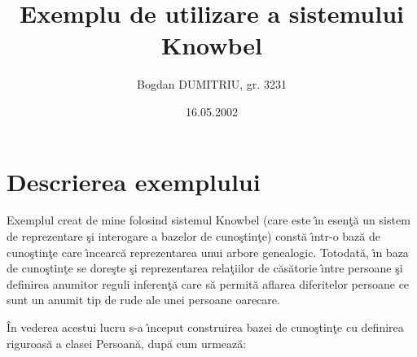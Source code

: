 \documentclass{article}
\title{Exemplu de utilizare a sistemului Knowbel}
\author{Bogdan DUMITRIU, gr. 3231}
\date{16.05.2002}
\begin{document}
\maketitle

\section{Descrierea exemplului}
Exemplul creat de mine folosind sistemul Knowbel (care este \^{\i}n esen\c{t}\u{a}
un sistem de reprezentare \c{s}i interogare a bazelor de cuno\c{s}tin\c{t}e)
const\u{a} \^{\i}ntr-o baz\u{a} de cuno\c{s}tin\c{t}e care \^{\i}ncearc\u{a}
reprezentarea unui arbore genealogic. Totodat\u{a}, \^{\i}n baza de cuno\c{s}tin\c{t}e
se dore\c{s}te \c{s}i reprezentarea rela\c{t}iilor de c\u{a}s\u{a}torie \^{\i}ntre
persoane \c{s}i definirea anumitor reguli inferen\c{t}\u{a} care s\u{a} permit\u{a}
aflarea diferitelor persoane ce sunt un anumit tip de rude ale unei persoane oarecare.

\^{I}n vederea acestui lucru s-a \^{\i}nceput construirea bazei de cuno\c{s}tin\c{t}e
cu definirea riguroas\u{a} a clasei Persoan\u{a}, dup\u{a} cum urmeaz\u{a}:
\end{document}
